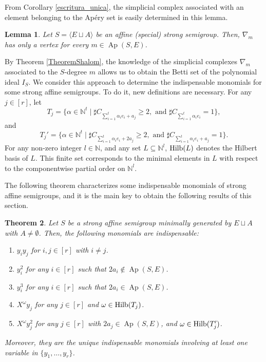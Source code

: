 \documentclass[a4paper,11pt]{article}
\newtheorem{theorem}{Theorem}
\newtheorem{lemma}[theorem]{Lemma}
\def\N{\mathbb{N}}
\def\Ap{\operatorname{Ap}}
\begin{document}
{From Corollary \ref{escritura_unica}, the simplicial complex associated with an element belonging to the Apéry set is easily determined in this lemma.

\begin{lemma}
Let $S=\langle E\sqcup A\rangle$ be an affine (special) strong semigroup. Then, $\nabla _m$ has only a vertex for every $m\in \Ap (S,E)$.
\end{lemma}

By Theorem \ref{TheoremShalom}, the knowledge of the simplicial complexes $\nabla_m$ associated to the $S$-degree $m$ allows us to obtain the Betti set of the polynomial ideal $I_S$. We consider this approach to determine the indispensable monomials for some strong affine semigroups. To do it, new definitions are necessary. For any $j\in[r]$, let
$$T_j=\Big\{ \alpha \in \N^t\mid \sharp C_{\sum_{i=1}^t \alpha_ie_i+a_j}\ge 2, \mbox{ and } \sharp C_{\sum_{i=1}^t \alpha_ie_i}=1\Big\},$$
and
$$T_j'=\Big\{ \alpha \in \N^t\mid \sharp C_{\sum_{i=1}^t \alpha_ie_i+2a_j}\ge 2, \mbox{ and } \sharp C_{\sum_{i=1}^t \alpha_ie_i+a_j}=1\Big\}.$$
For any non-zero integer $l\in \N$, and any set $L\subseteq \N^l$, ${\rm Hilb}(L)$ denotes the Hilbert basis of $L$. This finite set corresponds to the minimal elements in $L$ with respect to the componentwise partial order on $\N^l$.

The following theorem characterizes some indispensable monomials of strong affine semigroups, and it is the main key to obtain the following results of this section.

\begin{theorem}\label{TheoremYiYj}
Let $S$ be a strong affine semigroup minimally generated by $E\sqcup A$ with $A\neq \emptyset$. Then, the following monomials are indispensable:
\begin{enumerate}
\item $y_i y_j$ for $i,j\in [r]$ with $i\neq j$.
\item $y_i^2$ for any $i\in [r]$ such that $2a_i\notin \Ap(S,E)$.
\item $y_i^3$ for any $i\in [r]$ such that $2a_i\in \Ap(S,E)$.
\item $X^\omega y_j$  for any $j\in [r]$ and $\omega \in {\rm Hilb} (T_j)$.
\item $X^\omega y_j^2$  for any $j\in [r]$ with $2a_j\in\Ap(S,E)$, and $\omega \in {\rm Hilb} (T'_j)$.
\end{enumerate}
Moreover, they are the unique indispensable monomials involving at least one variable in $\{y_1,\ldots, y_r\}$.
\end{theorem}

}
\end{document}

